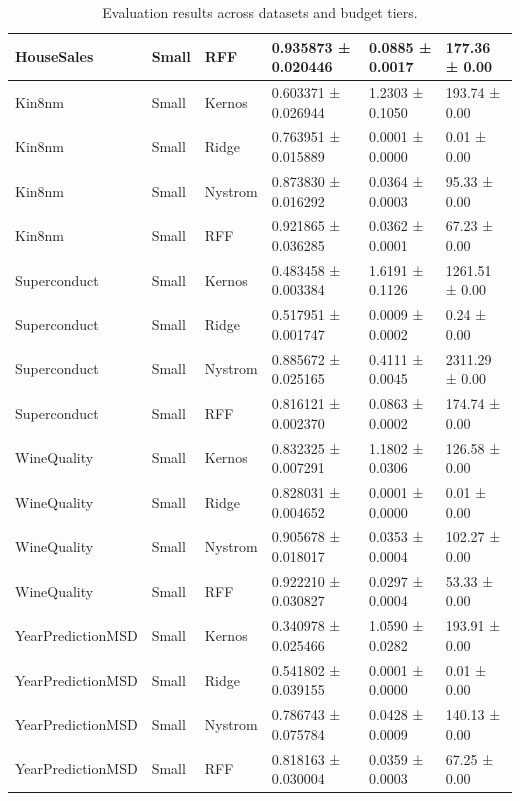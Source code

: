 \begin{table}[ht]
\begin{tabular}{llllll}
HouseSales & Small & RFF & 0.935873 ± 0.020446 & 0.0885 ± 0.0017 & 177.36 ± 0.00 \\
\midrule
Kin8nm & Small & Kernos & 0.603371 ± 0.026944 & 1.2303 ± 0.1050 & 193.74 ± 0.00 \\
Kin8nm & Small & Ridge & 0.763951 ± 0.015889 & 0.0001 ± 0.0000 & 0.01 ± 0.00 \\
Kin8nm & Small & Nystrom & 0.873830 ± 0.016292 & 0.0364 ± 0.0003 & 95.33 ± 0.00 \\
Kin8nm & Small & RFF & 0.921865 ± 0.036285 & 0.0362 ± 0.0001 & 67.23 ± 0.00 \\
\midrule
Superconduct & Small & Kernos & 0.483458 ± 0.003384 & 1.6191 ± 0.1126 & 1261.51 ± 0.00 \\
Superconduct & Small & Ridge & 0.517951 ± 0.001747 & 0.0009 ± 0.0002 & 0.24 ± 0.00 \\
Superconduct & Small & Nystrom & 0.885672 ± 0.025165 & 0.4111 ± 0.0045 & 2311.29 ± 0.00 \\
Superconduct & Small & RFF & 0.816121 ± 0.002370 & 0.0863 ± 0.0002 & 174.74 ± 0.00 \\
\midrule
WineQuality & Small & Kernos & 0.832325 ± 0.007291 & 1.1802 ± 0.0306 & 126.58 ± 0.00 \\
WineQuality & Small & Ridge & 0.828031 ± 0.004652 & 0.0001 ± 0.0000 & 0.01 ± 0.00 \\
WineQuality & Small & Nystrom & 0.905678 ± 0.018017 & 0.0353 ± 0.0004 & 102.27 ± 0.00 \\
WineQuality & Small & RFF & 0.922210 ± 0.030827 & 0.0297 ± 0.0004 & 53.33 ± 0.00 \\
\midrule
YearPredictionMSD & Small & Kernos & 0.340978 ± 0.025466 & 1.0590 ± 0.0282 & 193.91 ± 0.00 \\
YearPredictionMSD & Small & Ridge & 0.541802 ± 0.039155 & 0.0001 ± 0.0000 & 0.01 ± 0.00 \\
YearPredictionMSD & Small & Nystrom & 0.786743 ± 0.075784 & 0.0428 ± 0.0009 & 140.13 ± 0.00 \\
YearPredictionMSD & Small & RFF & 0.818163 ± 0.030004 & 0.0359 ± 0.0003 & 67.25 ± 0.00 \\
\midrule
\bottomrule
\end{tabular}
\caption{Evaluation results across datasets and budget tiers.}
\end{table}
